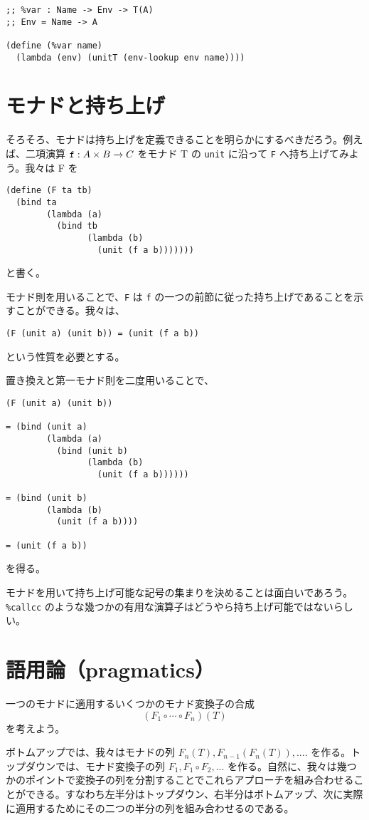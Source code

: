 \documentclass[11pt, oneside]{jsbook}   	%
\begin{document}
\begin{lstlisting}
;; %var : Name -> Env -> T(A)
;; Env = Name -> A

(define (%var name)
  (lambda (env) (unitT (env-lookup env name))))
\end{lstlisting}

\section{ モナドと持ち上げ }
そろそろ、モナドは持ち上げを定義できることを明らかにするべきだろう。例えば、二項演算 $\verb|f| : A \times B \rightarrow C$ をモナド T の \verb|unit| に沿って \verb|F| へ持ち上げてみよう。我々は F を
\begin{lstlisting}
(define (F ta tb)
  (bind ta
        (lambda (a)
          (bind tb
                (lambda (b)
                  (unit (f a b)))))))
\end{lstlisting}
と書く。

モナド則を用いることで、\verb|F| は \verb|f| の一つの前節に従った持ち上げであることを示すことができる。我々は、
\begin{lstlisting}
(F (unit a) (unit b)) = (unit (f a b))
\end{lstlisting}
という性質を必要とする。

置き換えと第一モナド則を二度用いることで、
\begin{lstlisting}
(F (unit a) (unit b))

= (bind (unit a)
        (lambda (a)
          (bind (unit b)
                (lambda (b)
                  (unit (f a b))))))

= (bind (unit b)
        (lambda (b)
          (unit (f a b))))

= (unit (f a b))
\end{lstlisting}
を得る。

モナドを用いて持ち上げ可能な記号の集まりを決めることは面白いであろう。\verb|%callcc| のような幾つかの有用な演算子はどうやら持ち上げ可能ではないらしい。

\section{ 語用論（pragmatics） }
一つのモナドに適用するいくつかのモナド変換子の合成
$$
(F_1 \circ \cdots \circ F_n)(T)
$$
を考えよう。

ボトムアップでは、我々はモナドの列 $F_n(T), F_{n-1}(F_n(T)), ....$ を作る。トップダウンでは、モナド変換子の列 $F_1, F_1\circ F_2 , ...$ を作る。自然に、我々は幾つかのポイントで変換子の列を分割することでこれらアプローチを組み合わせることができる。すなわち左半分はトップダウン、右半分はボトムアップ、次に実際に適用するためにその二つの半分の列を組み合わせるのである。
\end{document}
